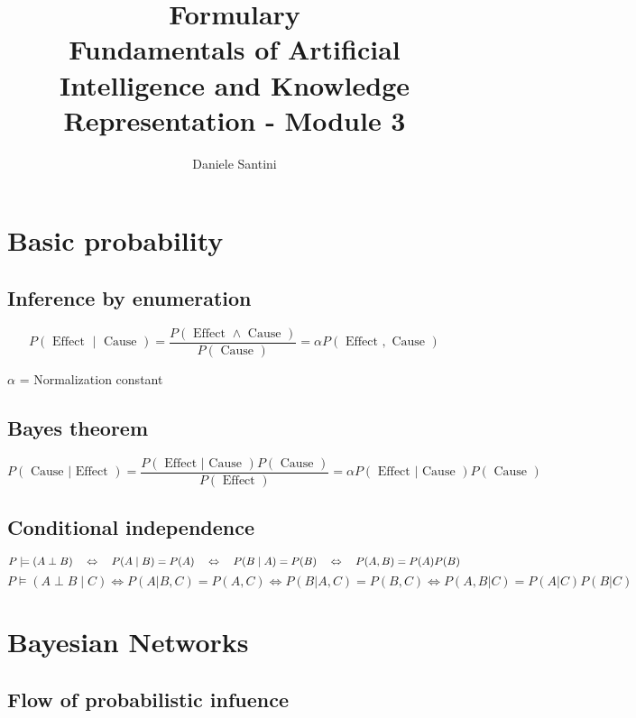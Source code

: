 \documentclass[]{article}
\title{Formulary \\ \large Fundamentals of Artificial Intelligence and Knowledge Representation - Module 3}
\author{Daniele Santini}
\begin{document}

\section{Basic probability}

\subsection{Inference by enumeration}
$$
P(\text { Effect } \mid \text { Cause })=\frac{P(\text { Effect } \wedge \text { Cause })}{P(\text { Cause })}=\alpha P(\text { Effect }, \text { Cause })
$$

$\alpha$ = Normalization constant

\subsection{Bayes theorem}
$$
P(\text { Cause } | \text { Effect })=\frac{P(\text { Effect } | \text { Cause }) P( \text{ Cause })}{P(\text { Effect })}=\alpha P(\text { Effect } | \text { Cause }) P( \text{ Cause })
$$

\subsection{Conditional independence}

$$
P \models (A \perp B) \hspace{1em} \Leftrightarrow \hspace{1em} P(A \mid B)=P(A) \hspace{1em} \Leftrightarrow \hspace{1em} P(B \mid A)=P(B) \hspace{1em} \Leftrightarrow \hspace{1em} P(A,B)=P(A)P(B)
\newline
$$$$
P \models (A \perp B \mid C) \Leftrightarrow P(A|B,C) = P(A,C) \Leftrightarrow P(B|A,C) = P(B,C) \Leftrightarrow P(A,B|C) = P(A|C)P(B|C)
$$

\section{Bayesian Networks}

\subsection{Flow of probabilistic infuence}
\end{document}
